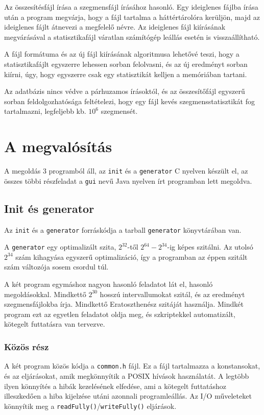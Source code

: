 Az összesítésfájl írása a szegmensfájl írásához hasonló.
Egy ideiglenes fájlba írása után a program megvárja, hogy a fájl tartalma a háttértárolóra kerüljön, majd az ideiglenes fájlt átnevezi a megfelelő névre.
Az ideiglenes fájl kiírásának megvárásával a statisztikafájl váratlan számítógép leállás esetén is visszaállítható.

A fájl formátuma és az új fájl kiírásának algoritmusa lehetővé teszi, hogy a statisztikafájlt egyszerre lehessen sorban felolvasni, és az új eredményt sorban kiírni, úgy, hogy egyszerre csak egy statisztikát kelljen a memóriában tartani.

Az adatbázis nincs védve a párhuzamos írásoktól, és az összesítőfájl egyszerű sorban feldolgozhatósága feltételezi, hogy egy fájl kevés szegmensstatisztikát fog tartalmazni, legfeljebb kb. $10^6$ szegmensét.

\section{A megvalósítás}

A megoldás 3 programból áll, az \texttt{init} és a \texttt{generator} C nyelven készült el, az összes többi részfeladat a \texttt{gui} nevű Java nyelven írt programban lett megoldva.

\subsection{Init és generator}

Az \texttt{init} és a \texttt{generator} forráskódja a tarball \texttt{generator} könyvtárában van.

A \texttt{generator} egy optimalizált szita, $2^{32}$-től $2^{64}-2^{34}$-ig képes szitálni.
Az utolsó $2^{34}$ szám kihagyása egyszerű optimalizáció, így a programban az éppen szitált szám változója sosem csordul túl.

A két program egymáshoz nagyon hasonló feladatot lát el, hasonló megoldásokkal.
Mindkettő $2^{30}$ hosszú intervallumokat szitál, és az eredményt szegmensfájlokba írja.
Mindkettő Eratoszthenész szitáját használja.
Mindkét program ezt az egyetlen feladatot oldja meg, és szkriptekkel automatizált, kötegelt futtatásra van tervezve.

\subsubsection{Közös rész}

A két program közös kódja a \texttt{common.h} fájl.
Ez a fájl tartalmazza a konstansokat, és az eljárásokat, amik megkönnyítik a POSIX hívások használatát.
A legtöbb ilyen könnyítés a hibák kezelésének elfedése, ami a kötegelt futtatáshoz illeszkedően
a hiba kijelzése utáni azonnali programleállás.
Az I/O műveleteket könnyítik meg a \texttt{readFully()}/\texttt{writeFully()} eljárások.


